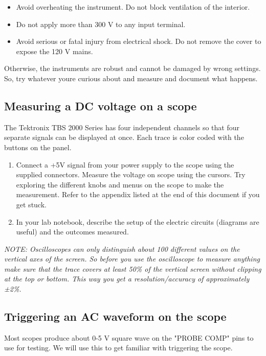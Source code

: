 \documentclass[10pt]{PhysLab1C} %
\begin{document}
\begin{itemize}
\item
  Avoid overheating the instrument. Do not block ventilation of the
  interior.
\item
  Do not apply more than 300 V to any input terminal.
\item
  Avoid serious or fatal injury from electrical shock. Do not remove the
  cover to expose the 120 V mains.
\end{itemize}

Otherwise, the instruments are robust and cannot be damaged by wrong
settings. So, try whatever you\textquotesingle re curious about and
measure and document what happens.

\subsection{Measuring a DC voltage on a scope}

The Tektronix TBS 2000 Series has four independent channels so that four
separate signals can be displayed at once. Each trace is color coded
with the buttons on the panel.

\begin{enumerate}
\def\labelenumi{\arabic{enumi}.}
\item
  Connect a +5V signal from your power supply to the scope using the
  supplied connectors. Measure the voltage on scope using the cursors.
  Try exploring the different knobs and menus on the scope to make the
  measurement. Refer to the appendix listed at the end of this document
  if you get stuck.
\item
  In your lab notebook, describe the setup of the electric circuits
  (diagrams are useful) and the outcomes measured.
\end{enumerate}

\emph{NOTE: Oscilloscopes can only distinguish about 100 different
values on the vertical axes of the screen. So before you use the
oscilloscope to measure anything make sure that the trace covers at
least 50\% of the vertical screen without clipping at the top or bottom.
This way you get a resolution/accuracy of approximately ±2\%.}

\subsection{Triggering an AC waveform on the scope}

Most scopes produce about 0-5 V square wave on the "PROBE COMP" pins to
use for testing. We will use this to get familiar with triggering the
scope.
\end{document}
